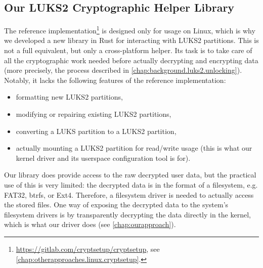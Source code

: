 \subsection{Our LUKS2 Cryptographic Helper Library}
\label{chap:background.luks2.helperlib}
The reference implementation\footnote{\label{fn:background.luks2.referenceimpl} \url{https://gitlab.com/cryptsetup/cryptsetup}, see \autoref{chap:otherapproaches.linux.cryptsetup}.} is designed only for usage on Linux, which is why we developed a new library in Rust for interacting with LUKS2 partitions. This is not a full equivalent, but only a cross-platform helper. Its task is to take care of all the cryptographic work needed before actually decrypting and encrypting data (more precisely, the process described in \autoref{chap:background.luks2.unlocking}). Notably, it lacks the following features of the reference implementation:
\begin{itemize}
	\item formatting new LUKS2 partitions,
	\item modifying or repairing existing LUKS2 partitions,
	\item converting a LUKS partition to a LUKS2 partition,
	\item actually mounting a LUKS2 partition for read/write usage (this is what our kernel driver and its userspace configuration tool is for).
\end{itemize}
Our library does provide access to the raw decrypted user data, but the practical use of this is very limited: the decrypted data is in the format of a filesystem, e.g. FAT32, btrfs, or Ext4. Therefore, a filesystem driver is needed to actually access the stored files. One way of exposing the decrypted data to the system's filesystem drivers is by transparently decrypting the data directly in the kernel, which is what our driver does (see \autoref{chap:ourapproach}).

